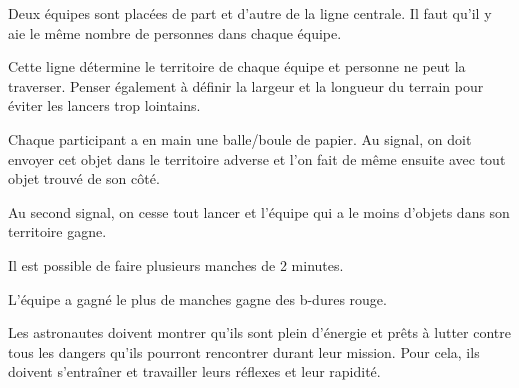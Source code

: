 \documentclass{grand-jeu}
\begin{document}
\begin{liste-materiel}
\end{liste-materiel}

\begin{regles}
Deux équipes sont placées de part et d’autre de la ligne centrale. Il faut qu'il y aie le même nombre de personnes dans chaque équipe. 

Cette ligne détermine le territoire de chaque équipe et personne ne peut la traverser. Penser également à définir la largeur et la longueur du terrain pour éviter les lancers trop lointains.

Chaque participant a en main une balle/boule de papier. Au signal, on doit envoyer cet objet dans le territoire adverse et l’on fait de même ensuite avec tout objet trouvé de son côté. 

Au second signal, on cesse tout lancer et l’équipe qui a le moins d’objets dans son territoire gagne.

Il est possible de faire plusieurs manches de 2 minutes.

L’équipe a gagné le plus de manches gagne des b-dures rouge. 
\end{regles}

\begin{imaginaire}
Les astronautes doivent montrer qu'ils sont plein d'énergie et prêts à lutter contre tous les dangers qu'ils pourront rencontrer durant leur mission. Pour cela, ils doivent s'entraîner et travailler leurs réflexes et leur rapidité.
\end{imaginaire}

\begin{moments-stop}
\end{moments-stop}
\end{document}
